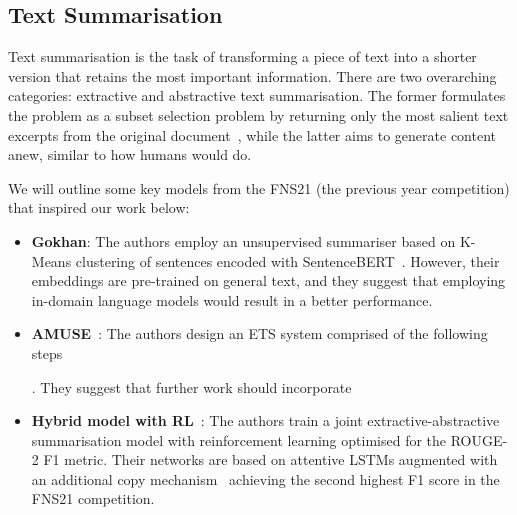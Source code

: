 \subsection{Text Summarisation}\label{subsec:text-summarisation}
Text summarisation is the task of transforming a piece of text into a shorter  version that retains the most important information.
There are two overarching categories: extractive and abstractive text summarisation.
The former formulates the problem as a subset selection problem by returning only the most salient text excerpts from the original document~\cite{zhong-etal-2020-extractive}, while the latter aims to generate content anew, similar to how humans would do.

We will outline some key models from the FNS21 (the previous year competition) that inspired our work below:
\begin{itemize}
    \item \textbf{Gokhan}: The authors employ an unsupervised summariser based on K-Means clustering of sentences encoded with SentenceBERT~\cite{reimers2019sentence}.
    However, their embeddings are pre-trained on general text, and they suggest that employing in-domain language models would result in a better performance.

    \item \textbf{AMUSE}~\cite{litvak-vanetik-2021-summarization}: The authors design an ETS system comprised of the following steps .
    They suggest that further work should incorporate 

    \item \textbf{Hybrid model with RL}~\cite{zmandar-etal-2021-joint}: The authors train a joint extractive-abstractive summarisation model with reinforcement learning optimised for the ROUGE-2 F1 metric.
    Their networks are based on attentive LSTMs augmented with an additional copy mechanism~\cite{vinyals2015pointer} achieving the second highest F1 score in the FNS21 competition.


\end{itemize}
